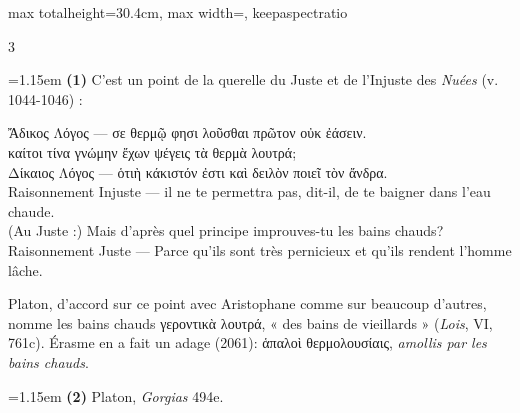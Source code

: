\documentclass[11pt,twoside]{book}
\newcommand{\italique}[1]{\textit{#1}}
\newcommand{\citComm}[1]{\begin{quoting}[vskip=0.4pt,leftmargin=0.7em,rightmargin=0.2em]#1\end{quoting}}
\newcommand{\francais}[1]{{\policeFr #1}}
\begin{document}
\begin{adjustbox}{max totalheight=30.4cm, max width=\textwidth, keepaspectratio}
\begin{minipage}{\textwidth}
{\begin{multicols}{3}
\par\vspace{1.5pt}
\par\vspace{1.2pt}\par\nopagebreak\vspace{1pt}\noindent\hangindent=1.15em {\color{sepiaNote}\textbf{(1)}} C'est un point de la querelle du Juste et de l'Injuste des \italique{Nuées} (v. 1044-1046) :
\citComm{Ἄδικος Λόγος — σε θερμῷ φησι λοῦσθαι πρῶτον οὐκ ἐάσειν.\\
καίτοι τίνα γνώμην ἔχων ψέγεις τὰ θερμὰ λουτρά;\\
Δίκαιος Λόγος — ὁτιὴ κάκιστόν ἐστι καὶ δειλὸν ποιεῖ τὸν ἄνδρα.\\
\francais{Raisonnement Injuste — il ne te permettra pas, dit-il, de te baigner dans l'eau chaude.\\
(Au Juste :) Mais d'après quel principe improuves-tu les bains chauds? \\
Raisonnement Juste — Parce qu'ils sont très pernicieux et qu'ils rendent l'homme lâche.}}
\par\vspace{1.5pt}
\noindent Platon, d'accord sur ce point avec Aristophane comme sur beaucoup d'autres, nomme les bains chauds γεροντικὰ λουτρά, « des bains de vieillards » (\italique{Lois}, VI, 761c). Érasme en a fait un adage (2061): ἁπαλοὶ θερμολουσίαις, \italique{amollis par les bains chauds}.
\par\vspace{1.5pt}
\noindent\hangindent=1.15em {\color{sepiaNote}\textbf{(2)}} Platon, \italique{Gorgias} 494e.
\par\vspace{1.5pt}

\end{multicols}}
\end{minipage}
\end{adjustbox}
\end{document}
